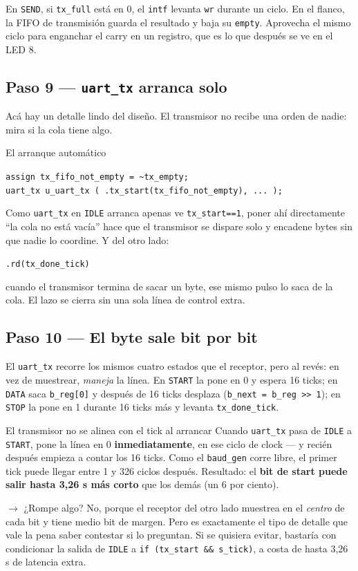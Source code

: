 \documentclass[11pt,a4paper]{article}
\newcommand{\sg}[1]{\texttt{\small #1}}
\begin{document}
En \sg{SEND}, si \sg{tx\_full} est\'a en 0, el \sg{intf} levanta \sg{wr} durante
un ciclo. En el flanco, la FIFO de transmisi\'on guarda el resultado y baja su
\sg{empty}. Aprovecha el mismo ciclo para enganchar el carry en un registro,
que es lo que despu\'es se ve en el LED 8.

\subsection{Paso 9 --- \texttt{uart\_tx} arranca solo}

Ac\'a hay un detalle lindo del dise\~no. El transmisor no recibe una orden de
nadie: mira si la cola tiene algo.

\begin{ficha}{El arranque autom\'atico}
\begin{center}
\sg{assign tx\_fifo\_not\_empty = \textasciitilde tx\_empty;}\\
\sg{uart\_tx u\_uart\_tx ( .tx\_start(tx\_fifo\_not\_empty), ... );}
\end{center}
Como \sg{uart\_tx} en \sg{IDLE} arranca apenas ve \sg{tx\_start==1}, poner ah\'i
directamente ``la cola no est\'a vac\'ia'' hace que el transmisor se dispare solo
y encadene bytes sin que nadie lo coordine. Y del otro lado:
\begin{center}\sg{.rd(tx\_done\_tick)}\end{center}
cuando el transmisor termina de sacar un byte, ese mismo pulso lo saca de la cola.
El lazo se cierra sin una sola l\'inea de control extra.
\end{ficha}

\subsection{Paso 10 --- El byte sale bit por bit}

El \sg{uart\_tx} recorre los mismos cuatro estados que el receptor, pero al
rev\'es: en vez de muestrear, \emph{maneja} la l\'inea. En \sg{START} la pone en 0
y espera 16 ticks; en \sg{DATA} saca \sg{b\_reg[0]} y despu\'es de 16 ticks
desplaza (\sg{b\_next = b\_reg >> 1}); en \sg{STOP} la pone en 1 durante 16 ticks
m\'as y levanta \sg{tx\_done\_tick}.

\begin{ojo}{El transmisor no se alinea con el tick al arrancar}
Cuando \sg{uart\_tx} pasa de \sg{IDLE} a \sg{START}, pone la l\'inea en 0
\textbf{inmediatamente}, en ese ciclo de clock --- y reci\'en despu\'es empieza a
contar los 16 ticks. Como el \sg{baud\_gen} corre libre, el primer tick puede
llegar entre 1 y 326 ciclos despu\'es. Resultado: el \textbf{bit de start puede
salir hasta 3,26 \textmu s m\'as corto} que los dem\'as (un 6 por ciento).

\smallskip
$\rightarrow$ ¿Rompe algo? No, porque el receptor del otro lado muestrea en el
\emph{centro} de cada bit y tiene medio bit de margen. Pero es exactamente el
tipo de detalle que vale la pena saber contestar si lo preguntan. Si se quisiera
evitar, bastar\'ia con condicionar la salida de \sg{IDLE} a \sg{if (tx\_start \&\&
s\_tick)}, a costa de hasta 3,26 \textmu s de latencia extra.
\end{ojo}
\end{document}
